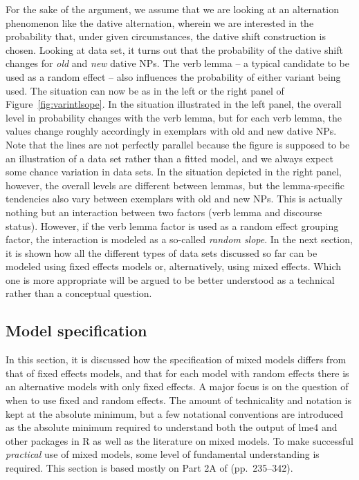 \documentclass[a4paper,12pt]{article}
\begin{document}
For the sake of the argument, we assume that we are looking at an alternation phenomenon like the dative alternation, wherein we are interested in the probability that, under given circumstances, the dative shift construction is chosen.
Looking at data set, it turns out that the probability of the dative shift changes for \textit{old} and \textit{new} dative NPs.
The verb lemma -- a typical candidate to be used as a random effect -- also influences the probability of either variant being used.
The situation can now be as in the left or the right panel of Figure~\ref{fig:varintlsope}.
In the situation illustrated in the left panel, the overall level in probability changes with the verb lemma, but for each verb lemma, the values change roughly accordingly in exemplars with old and new dative NPs.
Note that the lines are not perfectly parallel because the figure is supposed to be an illustration of a data set rather than a fitted model, and we always expect some chance variation in data sets.
In the situation depicted in the right panel, however, the overall levels are different between lemmas, but the lemma-specific tendencies also vary between exemplars with old and new NPs.
This is actually nothing but an interaction between two factors (verb lemma and discourse status).
However, if the verb lemma factor is used as a random effect grouping factor, the interaction is modeled as a so-called \textit{random slope}.
In the next section, it is shown how all the different types of data sets discussed so far can be modeled using fixed effects models or, alternatively, using mixed effects.
Which one is more appropriate will be argued to be better understood as a technical rather than a conceptual question.

\subsection{Model specification}
\label{sec:modelspecification}

In this section, it is discussed how the specification of mixed models differs from that of fixed effects models, and that for each model with random effects there is an alternative models with only fixed effects.
A major focus is on the question of when to use fixed and random effects.
The amount of technicality and notation is kept at the absolute minimum, but a few notational conventions are introduced as the absolute minimum required to understand both the output of lme4 and other packages in R as well as the literature on mixed models.
To make successful \textit{practical} use of mixed models, some level of fundamental understanding is required.
This section is based mostly on Part 2A of \citet{GelmanHill2006} (pp.~235--342).
\end{document}
